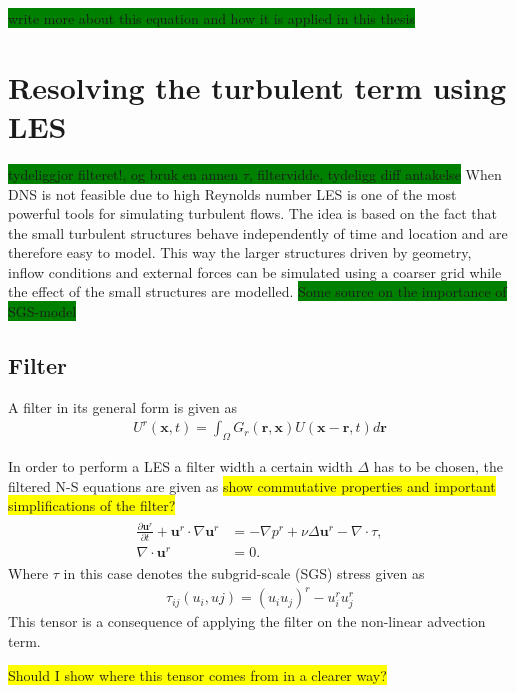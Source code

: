 \colorbox{green}{write more about this equation and how it is applied in this thesis}
\section{Resolving the turbulent term using LES}
\colorbox{green}{tydeliggjor filteret!, og bruk en annen $\tau$, filtervidde, tydeligg diff antakelse}
When DNS is not feasible due to high Reynolds number LES is one of the most powerful tools for simulating turbulent flows.
The idea is based on the fact that the small turbulent structures behave independently of time and location and are therefore 
easy to model. This way the larger structures driven by geometry, inflow conditions and external forces can be simulated using a coarser 
grid while the effect of the small structures are modelled. \colorbox{green}{Some source on the importance of SGS-model}

\subsection{Filter}
A filter in its general form is given as 
\begin{align}
    U^r(\mathbf{x},t) = \int_{\Omega} G_r(\mathbf{r},\mathbf{x})U(\mathbf{x}-\mathbf{r},t)d\mathbf{r}
    \label{eq:filter}
\end{align}

In order to perform a LES a filter width a certain width $\Delta$ has to be chosen, 
the filtered N-S equations are given as 
\colorbox{yellow}{show commutative properties and important simplifications of the filter?}
%
\begin{align}
    \begin{split}
        \frac{\partial \mathbf{u}^r}{\partial t} + \mathbf{u}^r\cdot \nabla\mathbf{u}^r
        &= -\nabla p^r +\nu\Delta \mathbf{u}^r-\nabla \cdot \tau, \\
        \nabla \cdot \mathbf{u}^r &= 0.
    \end{split}
	\label{eq:NSfiltered}
\end{align}
%
Where $\tau$ in this case denotes the subgrid-scale (SGS) stress given as 
\begin{align}
    \tau_{ij}(u_i,uj) = (u_iu_j)^r -u_i^ru_j^r
    \label{eq:sgstensor}
\end{align}
%
This tensor is a consequence of applying the filter on the non-linear advection term.

\colorbox{yellow}{Should I show where this tensor comes from in a clearer way?}

